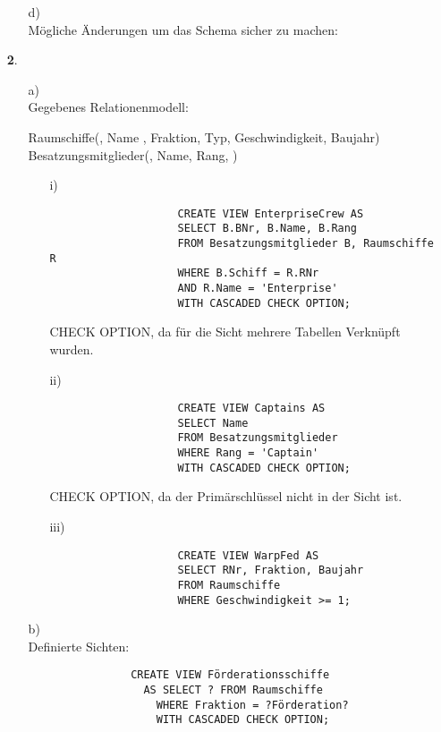 \documentclass[a4paper,11pt,fleqn]{scrartcl}
\begin{document}
\begin{enumerate}
\begin{enumerate}
			\item[d)] \quad \\
			Mögliche Änderungen um das Schema sicher zu machen:
		\end{enumerate}
	
			
		\item[\textbf{2}.]
		\begin{enumerate}
			\item[a)] \quad \\
			Gegebenes Relationenmodell: \\
			\begin{RMSchma}
				Raumschiffe(, Name , Fraktion, Typ, Geschwindigkeit, Baujahr)\\
				Besatzungsmitglieder(, Name, Rang, )
			\end{RMSchma}
			
			\begin{enumerate}
				\item[i)] \quad \\
				\begin{verbatim}
					CREATE VIEW EnterpriseCrew AS
					SELECT B.BNr, B.Name, B.Rang
					FROM Besatzungsmitglieder B, Raumschiffe R
					WHERE B.Schiff = R.RNr
					AND R.Name = 'Enterprise'
					WITH CASCADED CHECK OPTION;
				\end{verbatim}
				CHECK OPTION, da für die Sicht mehrere Tabellen Verknüpft wurden.

				\item[ii)] \quad \\
				\begin{verbatim}
					CREATE VIEW Captains AS
					SELECT Name
					FROM Besatzungsmitglieder
					WHERE Rang = 'Captain'
					WITH CASCADED CHECK OPTION;
				\end{verbatim}
				CHECK OPTION, da der Primärschlüssel nicht in der Sicht ist.

				\item[iii)] \quad \\
				\begin{verbatim}
					CREATE VIEW WarpFed AS
					SELECT RNr, Fraktion, Baujahr
					FROM Raumschiffe
					WHERE Geschwindigkeit >= 1;
				\end{verbatim}
			\end{enumerate}
		

			\item[b)] \quad \\
			Definierte Sichten:
			\begin{verbatim}
				CREATE VIEW Förderationsschiffe
				  AS SELECT ? FROM Raumschiffe
					WHERE Fraktion = ?Förderation?
					WITH CASCADED CHECK OPTION;


\end{verbatim}
\end{enumerate}
\end{enumerate}
\end{document}

